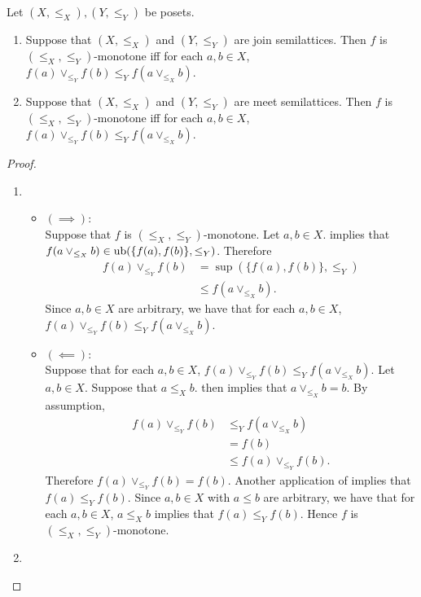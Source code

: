 \documentclass{book}
\begin{document}
	\begin{ex}
		Let $(X, \leq_X), (Y, \leq_Y)$ be posets. 
		\begin{enumerate}
			\item Suppose that $(X, \leq_X)$ and $(Y, \leq_Y)$ are join semilattices. Then $f$ is $(\leq_X, \leq_Y)$-monotone iff for each $a,b \in X$, $f(a) \vee_{\leq_Y} f(b) \leq_Y f(a \vee_{\leq_X} b)$.
			\item Suppose that $(X, \leq_X)$ and $(Y, \leq_Y)$ are meet semilattices. Then $f$ is $(\leq_X, \leq_Y)$-monotone iff for each $a,b \in X$, $f(a) \vee_{\leq_Y} f(b) \leq_Y f(a \vee_{\leq_X} b)$.
		\end{enumerate}
	\end{ex}
	
	\begin{proof}\
		\begin{enumerate}
			\item 
			\begin{itemize}
				\item $(\implies)$: \\
				Suppose that $f$ is $(\leq_X, \leq_Y)$-monotone. Let $a,b \in X$.  implies that $f(a \vee_{\leq_X} b) \in \operatorname{ub}(\{f(a), f(b)\}, \leq_Y)$. Therefore
				\begin{align*}
					f(a) \vee_{\leq_Y} f(b)
					& = \sup (\{f(a), f(b)\}, \leq_Y) \\
					& \leq f(a \vee_{\leq_X} b).
				\end{align*}
				Since $a,b \in X$ are arbitrary, we have that for each $a,b \in X$, $f(a) \vee_{\leq_Y} f(b) \leq_Y f(a \vee_{\leq_X} b)$.
				\item $(\impliedby)$: \\
				Suppose that for each $a,b \in X$, $f(a) \vee_{\leq_Y} f(b) \leq_Y f(a \vee_{\leq_X} b)$. Let $a,b \in X$. Suppose that $a \leq_X b$.  then implies that $a \vee_{\leq_X} b = b$. By assumption, 
				\begin{align*}
					f(a) \vee_{\leq_Y} f(b) 
					& \leq_Y f(a \vee_{\leq_X} b) \\
					& = f(b) \\
					& \leq f(a) \vee_{\leq_Y} f(b).
				\end{align*}
				Therefore $f(a) \vee_{\leq_Y} f(b) = f(b)$. Another application of  implies that $f(a) \leq_Y f(b)$. Since $a,b \in X$ with $a \leq b$ are arbitrary, we have that for each $a,b \in X$, $a \leq_X b$ implies that $f(a) \leq_Y f(b)$. Hence $f$ is $(\leq_X, \leq_Y)$-monotone.
			\end{itemize}
			\item {}
		\end{enumerate}
	\end{proof}
	
\end{document}
